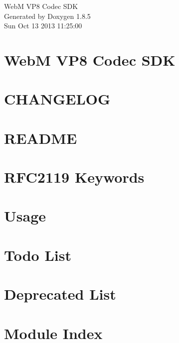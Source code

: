 \documentclass[twoside]{article}
\begin{document}
\hypersetup{pageanchor=false}
\begin{titlepage}
\vspace*{7cm}
\begin{center}%
{\Large Web\-M V\-P8 Codec S\-D\-K }\\
\vspace*{1cm}
{\large Generated by Doxygen 1.8.5}\\
\vspace*{0.5cm}
{\small Sun Oct 13 2013 11:25:00}\\
\end{center}
\end{titlepage}
\tableofcontents
{}
\hypersetup{pageanchor=true}

\section{Web\-M V\-P8 Codec S\-D\-K}
\label{index}\hypertarget{index}{}
\section{C\-H\-A\-N\-G\-E\-L\-O\-G}
\label{changelog}
\hypertarget{changelog}{}

\section{R\-E\-A\-D\-M\-E}
\label{readme}
\hypertarget{readme}{}

\section{R\-F\-C2119 Keywords}
\label{rfc2119}
\hypertarget{rfc2119}{}

\section{Usage}
\label{usage}
\hypertarget{usage}{}

\section{Todo List}
\label{todo}
\hypertarget{todo}{}

\section{Deprecated List}
\label{deprecated}
\hypertarget{deprecated}{}

\section{Module Index}

\end{document}
